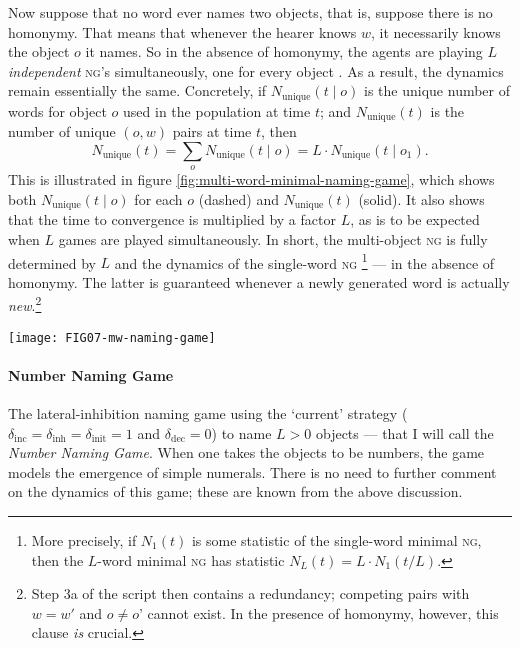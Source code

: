\documentclass{../src/bcthesispart}
\begin{document}
Now suppose that no word ever names two objects, that is, suppose there is no homonymy.
That means that whenever the hearer knows $w$, it necessarily knows the object $o$ it names.
So in the absence of homonymy, the agents are playing $L$ \emph{independent} \textsc{ng}'s simultaneously, one for every object \parencite{Baronchelli2008}.
As a result, the dynamics remain essentially the same.
Concretely, if $N_{\text{unique}}(t \mid o)$ is the unique number of words for object $o$ used in the population at time $t$; and $N_{\text{unique}}(t)$ is the number of unique $(o, w)$ pairs at time $t$, then 
\[
	N_{\text{unique}}(t) 
		= \sum_{o} N_{\text{unique}}(t \mid o) 
		= L \cdot N_{\text{unique}}(t \mid o_1).
\]
This is illustrated in figure \ref{fig:multi-word-minimal-naming-game}, which shows both $N_{\text{unique}}(t \mid o)$ for each $o$ (dashed) and $N_{\text{unique}}(t)$ (solid). 
It also shows that the time to convergence is multiplied by a factor $L$, as is to be expected when $L$ games are played simultaneously.
In short, the multi-object \textsc{ng} is fully determined by $L$ and the dynamics of the single-word \textsc{ng}%
	\footnote{More precisely, if $N_1(t)$ is some statistic of the single-word minimal \textsc{ng}, then the $L$-word minimal \textsc{ng} has statistic $N_L(t) = L \cdot N_1(t/L)$.}
— in the absence of homonymy. 
The latter is guaranteed whenever a newly generated word is actually \emph{new}.\footnote{Step 3a of the script then contains a redundancy; competing pairs with $w=w'$ and $o \neq o’$ cannot exist. In the presence of homonymy, however, this clause \emph{is} crucial.}

\begin{SCfigure}
	\texttt{[image: FIG07-mw-naming-game]}
	\caption{The multi-object \textsc{ng} (with $L=3$ objects) is the sum of independent single-word \textsc{ng}'s.
		Dashed lines show the statistics per object; solid lines for all $(o, w)$-pairs.
		The solid lines are the sums of the dashed lines.
		\\[1em]
		Results shown for 1 run; $N=200$, using the current strategy.
		\label{fig:multi-word-minimal-naming-game}}
\end{SCfigure}


\paragraph{Number Naming Game}
The lateral-inhibition naming game using the ‘current’ strategy ($\delta_{\text{inc}} = \delta_{\text{inh}} = \delta_{\text{init}} = 1$ and $\delta_{\text{dec}}=0$) to name $L>0$ objects — that I will call the \emph{Number Naming Game}.
When one takes the objects to be numbers, the game models the emergence of simple numerals. 
There is no need to further comment on the dynamics of this game; these are known from the above discussion.
\end{document}
